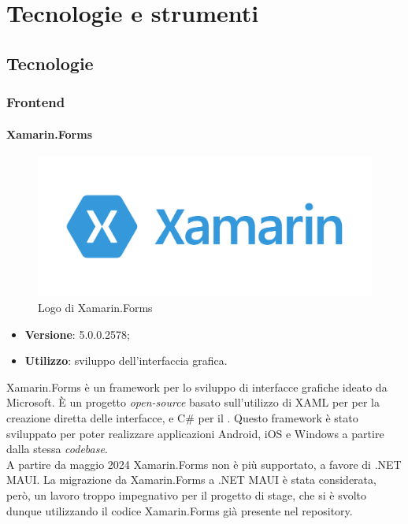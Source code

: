 \chapter{Tecnologie e strumenti}
\label{cap:tecnologie-strumenti}


\section{Tecnologie}

\subsection{Frontend}

\subsubsection{Xamarin.Forms}

\begin{figure}[H]
    \centering 
    \includegraphics[width=0.4\columnwidth]{images/loghi/xamarin-logo.png} 
    \caption{Logo di Xamarin.Forms}
\end{figure}

\begin{itemize}
    \item \textbf{Versione}: 5.0.0.2578;
    \item \textbf{Utilizzo}: sviluppo dell'interfaccia grafica.
\end{itemize}
Xamarin.Forms è un framework per lo sviluppo di interfacce grafiche ideato da Microsoft. È un progetto \emph{open-source} basato sull'utilizzo di XAML per per la creazione diretta delle interfacce, e C\# per il . Questo framework è stato sviluppato per poter realizzare applicazioni Android, iOS e Windows a partire dalla stessa \emph{codebase}.\\
A partire da maggio 2024 Xamarin.Forms non è più supportato, a favore di .NET MAUI. La migrazione da Xamarin.Forms a .NET MAUI è stata considerata, però, un lavoro troppo impegnativo per il progetto di stage, che si è svolto dunque utilizzando il codice Xamarin.Forms già presente nel repository.

